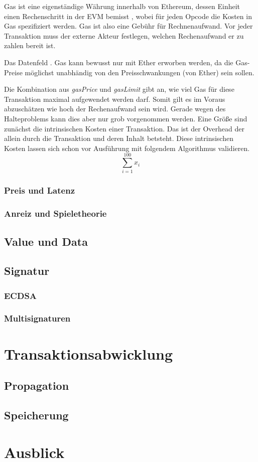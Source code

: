 \documentclass{llncs}
\begin{document}
Gas ist eine eigenständige Währung innerhalb von Ethereum, dessen Einheit einen Rechenschritt in der EVM bemisst \cite[S. 9:3]{m.spain_oasics-tokeneconomics_2019}, wobei für jeden Opcode die Kosten in Gas spezifiziert werden. \cite[S. 25 ff.]{wood_ethereum/yellowpaper_2019} Gas ist also eine Gebühr für Rechnenaufwand. Vor jeder Transaktion muss der externe Akteur festlegen, welchen Rechenaufwand er zu zahlen bereit ist.

Das Datenfeld . Gas kann bewusst nur mit Ether erworben werden, da die Gas-Preise möglichst unabhändig von den Preisschwankungen (von Ether) sein sollen. 

Die Kombination aus \textit{gasPrice} und \textit{gasLimit} gibt an, wie viel Gas für diese Transaktion maximal aufgewendet werden darf. Somit gilt es im Voraus abzuschätzen wie hoch der Rechenaufwand sein wird. Gerade wegen des Halteproblems kann dies aber nur grob vorgenommen werden. Eine Größe sind zunächst die intrinsischen Kosten einer Transaktion. Das ist der Overhead der allein durch die Transaktion und deren Inhalt betsteht. Diese intrinsischen Kosten lassen sich schon vor Ausführung mit folgendem Algorithmus validieren. 
\cite[S. 7]{wood_ethereum/yellowpaper_2019}
$$ \sum_{i=1}^{100} x_i $$
\subsubsection{Preis und Latenz}

\subsubsection{Anreiz und Spieletheorie}

\subsection{Value und Data}

\subsection{Signatur}

\subsubsection{ECDSA}

\subsubsection{Multisignaturen}

\section{Transaktionsabwicklung}

\subsection{Propagation}

\subsection{Speicherung}

\section{Ausblick}



\end{document}
